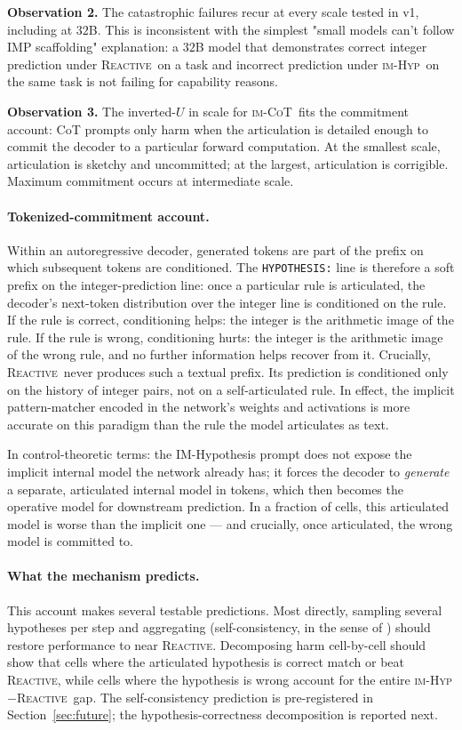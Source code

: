\documentclass[11pt]{article}
\newcommand{\imhyp}{\textsc{im-Hyp}}
\newcommand{\imcot}{\textsc{im-CoT}}
\newcommand{\reactive}{\textsc{Reactive}}
\begin{document}
\textbf{Observation 2.}  The catastrophic failures recur at every
scale tested in v1, including at $32$B.  This is inconsistent with
the simplest "small models can't follow IMP scaffolding"
explanation:  a $32$B model that demonstrates correct integer
prediction under \reactive\ on a task and incorrect prediction
under \imhyp\ on the same task is not failing for capability
reasons.

\textbf{Observation 3.}  The inverted-$U$ in scale for \imcot\
fits the commitment account:  CoT prompts only harm when the
articulation is detailed enough to commit the decoder to a
particular forward computation.  At the smallest scale,
articulation is sketchy and uncommitted; at the largest,
articulation is corrigible.  Maximum commitment occurs at
intermediate scale.

\paragraph{Tokenized-commitment account.}  Within an
autoregressive decoder, generated tokens are part of the prefix
on which subsequent tokens are conditioned.  The \verb|HYPOTHESIS:|
line is therefore a soft prefix on the integer-prediction line:
once a particular rule is articulated, the decoder's next-token
distribution over the integer line is conditioned on the rule.  If
the rule is correct, conditioning helps:  the integer is the
arithmetic image of the rule.  If the rule is wrong, conditioning
hurts:  the integer is the arithmetic image of the wrong rule, and
no further information helps recover from it.  Crucially,
\reactive\ never produces such a textual prefix.  Its prediction
is conditioned only on the history of integer pairs, not on a
self-articulated rule.  In effect, the implicit pattern-matcher
encoded in the network's weights and activations is more accurate
on this paradigm than the rule the model articulates as text.

In control-theoretic terms:  the IM-Hypothesis prompt does not
expose the implicit internal model the network already has; it
forces the decoder to \emph{generate} a separate, articulated
internal model in tokens, which then becomes the operative model
for downstream prediction.  In a fraction of cells, this articulated
model is worse than the implicit one --- and crucially, once
articulated, the wrong model is committed to.

\paragraph{What the mechanism predicts.}  This account makes
several testable predictions.  Most directly, sampling several
hypotheses per step and aggregating (self-consistency, in the
sense of \citealp{wang2023self}) should restore performance to
near \reactive.  Decomposing harm cell-by-cell should show that
cells where the articulated hypothesis is correct match or beat
\reactive, while cells where the hypothesis is wrong account for
the entire \imhyp$-$\reactive\ gap.  The self-consistency
prediction is pre-registered in Section~\ref{sec:future}; the
hypothesis-correctness decomposition is reported next.
\end{document}
